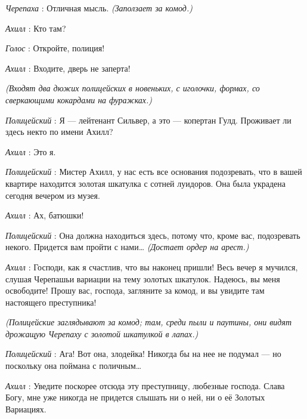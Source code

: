 \documentclass[../main.tex]{subfiles}
\begin{document}
\begin{dialogue}
\emph{Черепаха} : Отличная мысль. \emph{(Заползает за комод.)}

\emph{Ахилл} : Кто там?

\emph{Голос} : Откройте, полиция!

\emph{Ахилл} : Входите, дверь не заперта!

\emph{(Входят два дюжих полицейских в новеньких, с иголочки, формах, со сверкающими кокардами на фуражках.)}

\emph{Полицейский} : Я --- лейтенант Сильвер, а это --- копертан Гулд. Проживает ли здесь некто по имени Ахилл?

\emph{Ахилл} : Это я.

\emph{Полицейский} : Мистер Ахилл, у нас есть все основания подозревать, что в вашей квартире находится золотая шкатулка с сотней луидоров. Она была украдена сегодня вечером из музея.

\emph{Ахилл} : Ах, батюшки!

\emph{Полицейский} : Она должна находиться здесь, потому что, кроме вас, подозревать некого. Придется вам пройти с нами\ldots{} \emph{(Достает ордер на арест.)}

\emph{Ахилл} : Господи, как я счастлив, что вы наконец пришли! Весь вечер я мучился, слушая Черепашьи вариации на тему золотых шкатулок. Надеюсь, вы меня освободите! Прошу вас, господа, загляните за комод, и вы увидите там настоящего преступника!

\emph{(Полицейские заглядывают за комод; там, среди пыли и паутины, они видят дрожащую Черепаху с золотой шкатулкой в лапах.)}

\emph{Полицейский} : Ага! Вот она, злодейка! Никогда бы на нее не подумал --- но поскольку она поймана с поличным\ldots{}

\emph{Ахилл} : Уведите поскорее отсюда эту преступницу, любезные господа. Слава Богу, мне уже никогда не придется слышать ни о ней, ни о её Золотых Вариациях.

\end{dialogue}
\end{document}
